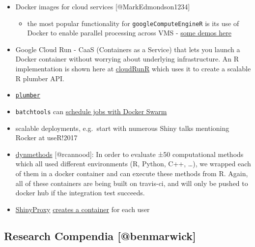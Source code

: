 \begin{itemize}
\tightlist
\item
  Docker images for cloud services {[}@MarkEdmondson1234{]}

  \begin{itemize}
  \tightlist
  \item
    the most popular functionality for \texttt{googleComputeEngineR} is
    its use of Docker to enable parallel processing across VMS -
    \href{https://cloudyr.github.io/googleComputeEngineR/articles/massive-parallel.html}{some
    demos here}
  \end{itemize}
\item
  Google Cloud Run - CaaS (Containers as a Service) that lets you launch
  a Docker container without worrying about underlying infrastructure.
  An R implementation is shown here at
  \href{https://github.com/MarkEdmondson1234/cloudRunR}{cloudRunR} which
  uses it to create a scalable R plumber API.
\item
  \href{https://www.rplumber.io/docs/hosting.html\#docker}{\texttt{plumber}}
\item
  \texttt{batchtools} \citep{Lang2017batchtools} can
  \href{https://mllg.github.io/batchtools/reference/makeClusterFunctionsDocker.html}{schedule
  jobs with Docker Swarm}
\item
  scalable deployments, e.g.~start with numerous Shiny talks mentioning
  Rocker at useR!2017
\item
  \href{https://github.com/dynverse/dynmethods}{dynmethods}
  {[}@rcannood{]}: In order to evaluate ±50 computational methods which
  all used different environments (R, Python, C++, \ldots), we wrapped
  each of them in a docker container and can execute these methods from
  R. Again, all of these containers are being built on travis-ci, and
  will only be pushed to docker hub if the integration test succeeds.
\item
  \href{https://www.shinyproxy.io/}{ShinyProxy}
  \href{https://github.com/openanalytics/shinyproxy/blob/master/src/main/java/eu/openanalytics/services/DockerService.java\#L388}{creates
  a container} for each user
\end{itemize}

\hypertarget{research-compendia-benmarwick}{%
\subsection{Research Compendia
{[}@benmarwick{]}}\label{research-compendia-benmarwick}}

